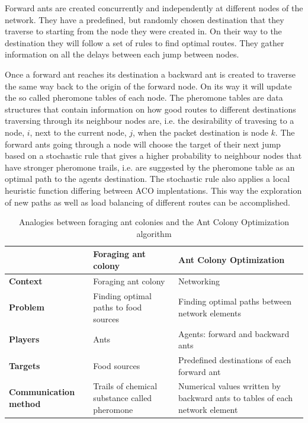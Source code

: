 \documentclass[cameraready]{IWORK2014}
\begin{document}
Forward ants are created concurrently and independently at different nodes of the network. They have a predefined, but randomly chosen destination that they traverse to starting from the node they were created in. On their way to the destination they will follow a set of rules to find optimal routes. They gather information on all the delays between each jump between nodes.

Once a forward ant reaches its destination a backward ant is created to traverse the same way back to the origin of the forward node. On its way it will update the so called pheromone tables of each node. The pheromone tables are data structures that contain information on how good routes to different destinations traversing through its neighbour nodes are, i.e. the desirability of travesing to a node, $i$, next to the current node, $j$, when the packet destination is node $k$. The forward ants going through a node will choose the target of their next jump based on a stochastic rule that gives a higher probability to neighbour nodes that have stronger pheromone trails, i.e. are suggested by the pheromone table as an optimal path to the agents destination. The stochastic rule also applies a local heuristic function differing between ACO implentations. This way the exploration of new paths as well as load balancing of different routes can be accomplished.

\begin{table}
    \centering
	\begin{tabularx}{0.90\textwidth}{|X|X|X|}
		\hline & \textbf{Foraging ant colony} & \textbf{Ant Colony Optimization} \\ \hline
		\textbf{Context} & Foraging ant colony & Networking \\ \hline
		\textbf{Problem} & Finding optimal paths to food sources & Finding optimal paths between network elements \\ \hline
		\textbf{Players} & Ants & Agents: forward and backward ants \\ \hline
		\textbf{Targets} & Food sources & Predefined destinations of each forward ant \\ \hline
		\textbf{Communication method} & Trails of chemical substance called pheromone & Numerical values written by backward ants to tables of each network element \\ \hline
	\end{tabularx}
	\caption{Analogies between foraging ant colonies and the Ant Colony Optimization algorithm}
	\label{tbl:analogies_ant}
\end{table}
\end{document}

